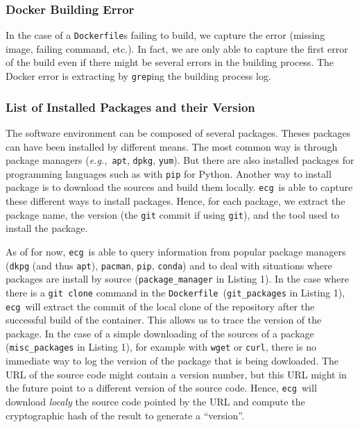 \documentclass[sigconf,natbib=false]{acmart}
\newcommand{\eg}{\emph{e.g.,}}
\newcommand{\df}{\texttt{Dockerfile}}
\newcommand{\ecg}{\texttt{ecg}}
\begin{document}
\subsubsection{Docker Building Error}

In the case of a \df s failing to build, we capture the error (missing image, failing command, etc.).
In fact, we are only able to capture the first error of the build even if there might be several errors in the building process.
The Docker error is extracting by \texttt{grep}ing the building process log.

\subsubsection{List of Installed Packages and their Version}

The software environment can be composed of several packages.
Theses packages can have been installed by different means.
The most common way is through package managers (\eg\ \texttt{apt}, \texttt{dpkg}, \texttt{yum}).
But there are also installed packages for programming languages such as with \texttt{pip} for Python.
Another way to install package is to download the sources and build them locally.
\ecg\ is able to capture these different ways to install packages.
Hence, for each package, we extract the package name, the version (the \texttt{git} commit if using \texttt{git}), and the tool used to install the package.

As of for now, \ecg\ is able to query information from popular package managers (\texttt{dkpg} (and thus \texttt{apt}), \texttt{pacman}, \texttt{pip}, \texttt{conda}) and to deal with situations where packages are install by source (\texttt{package\_manager} in Listing 1).
In the case where there is a \texttt{git clone} command in the \df\ (\texttt{git\_packages} in Listing 1), \ecg\ will extract the commit of the local clone of the repository after the successful build of the container.
This allows us to trace the version of the package.
In the case of a simple downloading of the sources of a package (\texttt{misc\_packages} in Listing 1), for example with \texttt{wget} or \texttt{curl}, there is no immediate way to log the version of the package that is being dowloaded.
The URL of the source code might contain a version number, but this URL might in the future point to a different version of the source code.
Hence, \ecg\ will download \emph{localy} the source code pointed by the URL and compute the cryptographic hash of the result to generate a ``version''.
\end{document}
